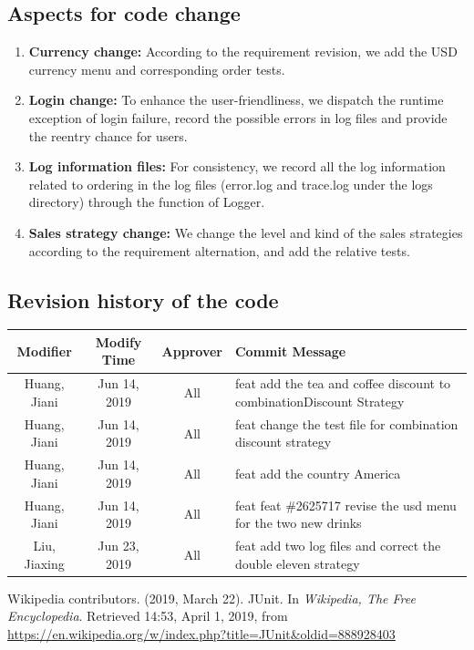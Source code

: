 \documentclass[a4paper]{report}
\begin{document}
\subsection{Aspects for code change}
\begin{enumerate}
\item \textbf{Currency change: } According to the requirement revision, we add the USD currency menu and corresponding order tests.
\item \textbf{Login change: } To enhance the user-friendliness, we dispatch the runtime exception of login failure, record the possible errors in log files and provide the reentry chance for users.
\item \textbf{Log information files: } For consistency, we record all the log information related to ordering in the log files (error.log and trace.log under the logs directory) through the function of Logger.
\item \textbf{Sales strategy change: } We change the level and kind of the sales strategies according to the requirement alternation, and add the relative tests.
\end{enumerate}
\subsection{Revision history of the code}
\begin{tabular}{|c|c|c|l|}
\hline 
Modifier&Modify Time&Approver&Commit Message\\
\hline  
Huang, Jiani&Jun 14, 2019&All&feat add the tea and coffee discount to combinationDiscount Strategy\\
\hline
Huang, Jiani&Jun 14, 2019&All&feat change the test file for combination discount strategy\\
\hline
Huang, Jiani&Jun 14, 2019&All&feat add the country America\\
\hline
Huang, Jiani&Jun 14, 2019&All&feat feat \#2625717 revise the usd menu for the two new drinks\\
\hline
Liu, Jiaxing&Jun 23, 2019&All&feat add two log files and correct the double eleven strategy\\
\hline
\end{tabular}


\begin{thebibliography}{A}
Wikipedia contributors. (2019, March 22). JUnit. In \emph{Wikipedia, The Free Encyclopedia}. Retrieved 14:53, April 1, 2019, from \url{https://en.wikipedia.org/w/index.php?title=JUnit&oldid=888928403}
\end{thebibliography}
\end{document}
